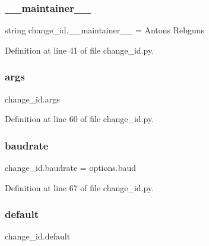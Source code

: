 \subsubsection{\texorpdfstring{\+\_\+\+\_\+maintainer\+\_\+\+\_\+}{\_\_maintainer\_\_}}
{\footnotesize\ttfamily string change\+\_\+id.\+\_\+\+\_\+maintainer\+\_\+\+\_\+ = \textquotesingle{}Antons Rebguns\textquotesingle{}\hspace{0.3cm}{\ttfamily [private]}}



Definition at line 41 of file change\+\_\+id.\+py.

\mbox{\label{namespacechange__id_a5bdd55ad16e9dd8f0c26ae691f0ad139}} 
\subsubsection{\texorpdfstring{args}{args}}
{\footnotesize\ttfamily change\+\_\+id.\+args}



Definition at line 60 of file change\+\_\+id.\+py.

\mbox{\label{namespacechange__id_a0a8aa88d41ea33a9c067b17f95eb9e50}} 
\subsubsection{\texorpdfstring{baudrate}{baudrate}}
{\footnotesize\ttfamily change\+\_\+id.\+baudrate = options.\+baud}



Definition at line 67 of file change\+\_\+id.\+py.

\mbox{\label{namespacechange__id_a7b49c89b7b2cc72645bcfacecfddce50}} 
\subsubsection{\texorpdfstring{default}{default}}
{\footnotesize\ttfamily change\+\_\+id.\+default}



